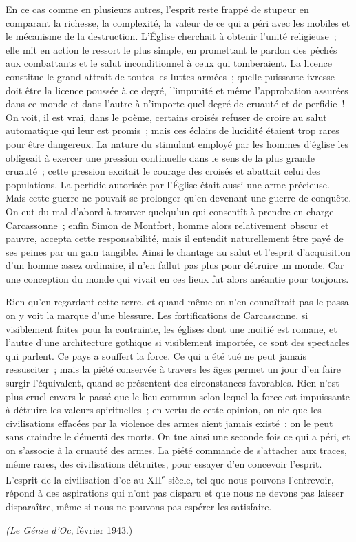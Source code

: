 \documentclass[french,twoside]{book} %
\begin{document}
En ce cas comme en plusieurs autres, l'esprit reste frappé de stupeur en comparant la richesse, la complexité, la valeur de ce qui a péri avec les mobiles et le mécanisme de la destruction. L'Église cherchait à obtenir l'unité religieuse ; elle mit en action le ressort le plus simple, en promettant le pardon des péchés aux combattants et le salut inconditionnel à ceux qui tomberaient. La licence constitue le grand attrait de toutes les luttes armées ; quelle puis­sante ivresse doit être la licence poussée à ce degré, l'impunité et même l'approbation assurées dans ce monde et dans l'autre à n'importe quel degré de cruauté et de perfidie ! On voit, il est vrai, dans le poème, certains croisés refuser de croire au salut automatique qui leur est promis ; mais ces éclairs de lucidité étaient trop rares pour être dangereux. La nature du stimulant employé par les hommes d'église les obligeait à exercer une pression continuelle dans le sens de la plus grande cruauté ; cette pression excitait le courage des croisés et abattait celui des populations. La perfidie autorisée par l'Église était aussi une arme précieuse. Mais cette guerre ne pouvait se prolonger qu'en devenant une guerre de conquête. On eut du mal d'abord à trouver quelqu'un qui consentît à prendre en charge Carcassonne ; enfin Simon de Montfort, homme alors relativement obscur et pauvre, accepta cette responsabilité, mais il entendit naturellement être payé de ses peines par un gain tangible. Ainsi le chantage au salut et l'esprit d'acquisition d'un homme assez ordinaire, il n'en fallut pas plus pour détruire un monde. Car une conception du monde qui vivait en ces lieux fut alors anéantie pour toujours.\par
Rien qu'en regardant cette terre, et quand même on n'en connaîtrait pas le passa on y voit la marque d'une blessure. Les fortifications de Carcassonne, si visiblement faites pour la contrainte, les églises dont une moitié est romane, et l'autre d'une architecture gothique si visiblement importée, ce sont des specta­cles qui parlent. Ce pays a souffert la force. Ce qui a été tué ne peut jamais ressusciter ; mais la piété conservée à travers les âges permet un jour d'en faire surgir l'équivalent, quand se présentent des circonstances favorables. Rien n'est plus cruel envers le passé que le lieu commun selon lequel la force est impuissante à détruire les valeurs spirituelles ; en vertu de cette opinion, on nie que les civilisations effacées par la violence des armes aient jamais existé ; on le peut sans craindre le démenti des morts. On tue ainsi une seconde fois ce qui a péri, et on s'associe à la cruauté des armes. La piété commande de s'attacher aux traces, même rares, des civilisations détruites, pour essayer d'en concevoir l'esprit. L'esprit de la civilisation d'oc au XII\textsuperscript{e} siècle, tel que nous pouvons l'entrevoir, répond à des aspirations qui n'ont pas disparu et que nous ne devons pas laisser disparaître, même si nous ne pouvons pas espérer les satisfaire.\par
{\itshape (Le Génie d'Oc}, février 1943.)\par
\end{document}
